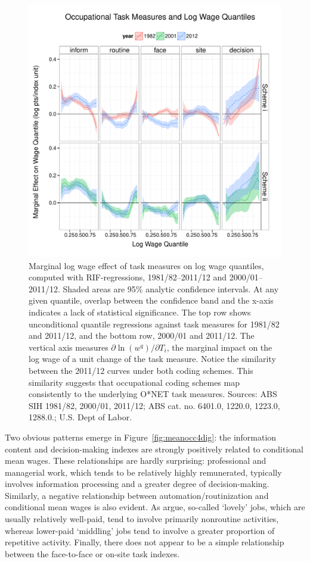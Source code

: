 \begin{figure}
  \centering
  \includegraphics[width=\textwidth]{../figure/rif2.pdf}
  \caption{Marginal log wage effect of task measures on log wage quantiles, computed with RIF-regressions, 1981/82--2011/12 and 2000/01--2011/12. Shaded areas are 95\% analytic confidence intervals. At any given quantile, overlap between the confidence band and the x-axis indicates a lack of statistical significance. The top row shows unconditional quantile regressions against task measures for 1981/82 and 2011/12, and the bottom row, 2000/01 and 2011/12. The vertical axis measures $\partial\ln(w^q)/\partial T_i$, the marginal impact on the log wage of a unit change of the task measure. Notice the similarity between the 2011/12 curves under both coding schemes. This similarity suggests that occupational coding schemes map consistently to the underlying O*NET task measures. Sources: ABS SIH 1981/82, 2000/01, 2011/12; ABS cat. no. 6401.0, 1220.0, 1223.0, 1288.0.; U.S. Dept of Labor.}
  \label{fig:rif}
\end{figure}

Two obvious patterns emerge in Figure~\ref{fig:meanocc4dig}: the information content and decision-making indexes are strongly positively related to conditional mean wages. These relationships are hardly surprising: professional and managerial work, which tends to be relatively highly remunerated, typically involves information processing and a greater degree of decision-making. Similarly, a negative relationship between automation/routinization and conditional mean wages is also evident. As \citet{Goos2009} argue, so-called `lovely' jobs, which are usually relatively well-paid, tend to involve primarily nonroutine activities, whereas lower-paid `middling' jobs tend to involve a greater proportion of repetitive activity. Finally, there does not appear to be a simple relationship between the face-to-face or on-site task indexes.

